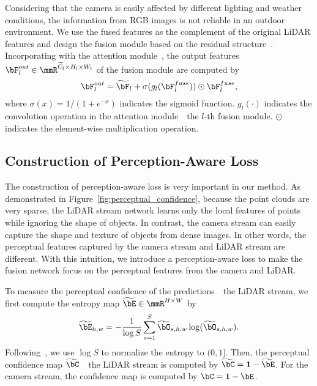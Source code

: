 \documentclass[10pt,twocolumn,letterpaper]{article}
\newcommand{\ice}[1]{{\color{black}#1}}
\begin{document}
\ice{Considering that the camera is easily affected by different lighting and weather conditions, the information from RGB images is not reliable in an outdoor environment. We use the fused features as the complement of the original LiDAR features and design the fusion module based on the residual structure~\cite{he2016deep}.} Incorporating with the attention module~\cite{bochkovskiy2020yolov4}, the output features $\bF_l^{out}\in\mmR^{\widetilde{C}_l \times H_l \times W_l}$ of the fusion module are computed by
\begin{equation}
\label{eq:fuse_add}
    \bF_l^{out} = \widetilde{\bF}_l + \sigma(g_l(\bF_l^{fuse}))\odot \bF_l^{fuse},
\end{equation}
where $\sigma(x)=1/(1+e^{-x})$ indicates the sigmoid function. $g_l(\cdot)$ indicates the convolution operation in the attention module~\wrt~the $l$-th fusion module. $\odot$ indicates the element-wise multiplication operation.










\subsection{Construction of Perception-Aware Loss}
\label{sec:loss}

The construction of perception-aware loss is very important in our method. As demonstrated in Figure~\ref{fig:perceptual_confidence}, because the point clouds are very sparse, the LiDAR stream network learns only the local features of points while ignoring the shape of objects. In contrast, the camera stream can easily capture the shape and texture of objects from dense images. In other words, the perceptual features captured by the camera stream and LiDAR stream are different. With this intuition, we introduce a perception-aware loss to make the fusion network focus on the perceptual features from the camera and LiDAR.


To measure the perceptual confidence of the predictions~\wrt~the LiDAR stream, we first compute the entropy map $\widetilde{\bE} \in \mmR^{H \times W}$ by 
\begin{equation}
\label{eq:entropy}
    \widetilde{\bE}_{h,w} = - \frac{1}{\log{S}}\sum_{s=1}^{S}\widetilde{\bO}_{s,h,w} \log(\widetilde{\bO}_{s,h,w}).
\end{equation}
Following~\cite{renyi1961measures}, we use $\log{S}$ to normalize the entropy to $(0,1]$. Then, the perceptual confidence map $\widetilde{\bC}$~\wrt~the LiDAR stream is computed by $\widetilde{\bC} = \textbf{1}-\widetilde{\bE}$. For the camera stream, the confidence map is computed by $\bC=\textbf{1}-\bE$.
\end{document}

